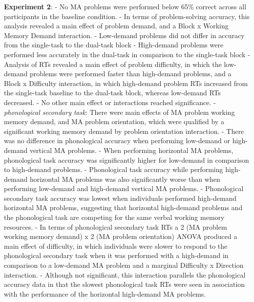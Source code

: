 \documentclass[
  doc, a4paper]{apa7}
\begin{document}
\textbf{Experiment 2}:
- No MA problems were performed below 65\% correct across all participants in the baseline condition.
- In terms of problem-solving accuracy, this analysis revealed a main effect of problem demand, and a Block x Working Memory Demand interaction.
- Low-demand problems did not differ in accuracy from the single-task to the dual-task block
- High-demand problems were performed less accurately in the dual-task in comparison to the single-task block
- Analysis of RTs revealed a main effect of problem difficulty, in which the low-demand problems were performed faster than high-demand problems, and a Block x Difficulty interaction, in which high-demand problem RTs increased from the single-task baseline to the dual-task block, whereas low-demand RTs decreased.
- No other main effect or interactions reached significance.
- \emph{phonological secondary task}: There were main effects of MA problem working memory demand, and MA problem orientation, which were qualified by a significant working memory demand by problem orientation interaction.
- There was no difference in phonological accuracy when performing low-demand or high-demand vertical MA problems.
- When performing horizontal MA problems, phonological task accuracy was significantly higher for low-demand in comparison to high-demand problems.
- Phonological task accuracy while performing high-demand horizontal MA problems was also significantly worse than when performing low-demand and high-demand vertical MA problems.
- Phonological secondary task accuracy was lowest when individuals performed high-demand horizontal MA problems, suggesting that horizontal high-demand problems and the phonological task are competing for the same verbal working memory resources.
- In terms of phonological secondary task RTs a 2 (MA problem working memory demand) x 2 (MA problem orientation) ANOVA produced a main effect of difficulty, in which individuals were slower to respond to the phonological secondary task when it was performed with a high-demand in comparison to a low-demand MA problem and a marginal Difficulty x Direction interaction.
- Although not significant, this interaction parallels the phonological accuracy data in that the slowest phonological task RTs were seen in association with the performance of the horizontal high-demand MA problems.
\end{document}
